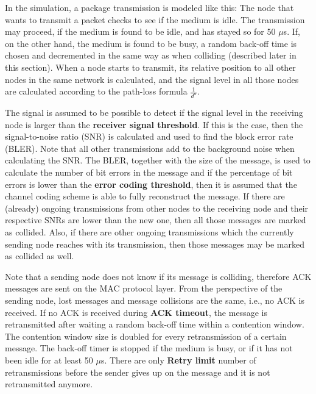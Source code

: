 \documentclass[final,twoside]{rapport}
\begin{document}
In the simulation, a package transmission is modeled like this: The node that wants to
transmit a packet checks to see if the medium is idle. The
transmission may proceed, if the medium is found to be idle, and has
stayed so for 50 $\mu$s. If, on the other hand, the medium is found to be busy, a random
back-off time is chosen and decremented in the same way as when
colliding (described later in this section). When a node starts to
transmit, its relative
position to all other nodes in the same network is calculated, and
the signal level in all those nodes are calculated according to the
path-loss formula $\frac{1}{d^a}$. 
%

The signal is assumed to be possible to detect if the signal level in
the receiving node is larger than the {\bf receiver signal threshold}.
If this is the case, then the signal-to-noise ratio (SNR) is
calculated and used to find the block error rate (BLER). Note that all
other transmissions add to the background noise when calculating the
SNR. The BLER, together with the size of the message, is used to
calculate the number of bit errors in the message and if the
percentage of bit errors is lower than the {\bf error coding
  threshold}, then it is assumed that the channel coding scheme is
able to fully reconstruct the message. If there are (already) ongoing
transmissions from other nodes to the receiving node and their
respective SNRs are lower than the new one, then all those messages
are marked as collided. Also, if there are other ongoing transmissions
which the currently sending node reaches with its transmission, then
those messages may be marked as collided as well.

Note that a sending node does not know if its message is colliding,
therefore ACK messages are sent on the MAC protocol layer. From the
perspective of the sending node, lost messages and message collisions
are the same, i.e., no ACK is received. If no ACK is received during
{\bf ACK timeout}, the message is retransmitted after waiting
a random back-off time within a contention window. The contention
window size is doubled for every retransmission of a certain message.
The back-off timer is stopped if the medium is busy, or if it has not
been idle for at least 50 $\mu$s. There are only {\bf Retry limit} number of
retransmissions before the sender gives up on the message and it is
not retransmitted anymore.
\end{document}

